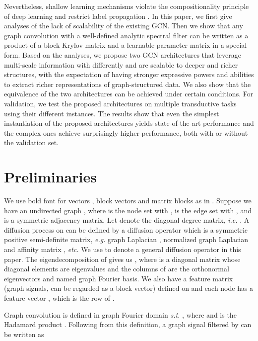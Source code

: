 \documentclass{article}
\newcommand\ie{\textit{i.e.}}
\newcommand\eg{\textit{e.g.}}
\newcommand\st{\textit{s.t.}}
\newcommand\etc{\textit{etc.}}
\begin{document}
Nevertheless, shallow learning mechanisms violate the compositionality principle of deep learning \cite{lecun2015deep, hinton2006fast} and restrict label propagation \cite{sun2019stage}. In this paper, we first give analyses of the lack of scalability of the existing GCN. Then we show that any graph convolution with a well-defined analytic spectral filter can be written as a product of a block Krylov matrix and a learnable parameter matrix in a special form. Based on the analyses, we propose two GCN architectures that leverage multi-scale information with differently and are scalable to deeper and richer structures, with the expectation of having stronger expressive powers and abilities to extract richer representations of graph-structured data. We also show that the equivalence of the two architectures can be achieved under certain conditions. For validation, we test the proposed architectures on multiple transductive tasks using their different instances. The results show that even the simplest instantiation of the proposed architectures yields state-of-the-art performance and the complex ones achieve surprisingly higher performance, both with or without the validation set.

\section{Preliminaries}
\label{sec:preliminaries}
We use bold font for vectors , block vectors  and matrix blocks  as in \cite{frommer2017block}. Suppose we have an undirected graph , where  is the node set with ,  is the edge set with , and  is a symmetric adjacency matrix. Let  denote the diagonal degree matrix, \ie{} . A diffusion process on  can be defined by a diffusion operator  \cite{coifman2006diffusion, coifman2006diffusionmaps} which is a symmetric positive semi-definite matrix, \eg{} graph Laplacian , normalized graph Laplacian  and affinity matrix , \etc{} We use  to denote a general diffusion operator in this paper. The eigendecomposition of  gives us , where  is a diagonal matrix whose diagonal elements are eigenvalues and the columns of  are the orthonormal eigenvectors and named graph Fourier basis. We also have a feature matrix (graph signals, can be regarded as a block vector)  defined on  and each node  has a feature vector , which is the  row of .

Graph convolution is defined in graph Fourier domain \st{} , where  and  is the Hadamard product \cite{defferrard2016fast}. Following from this definition, a graph signal  filtered by  can be written as
\end{document}
